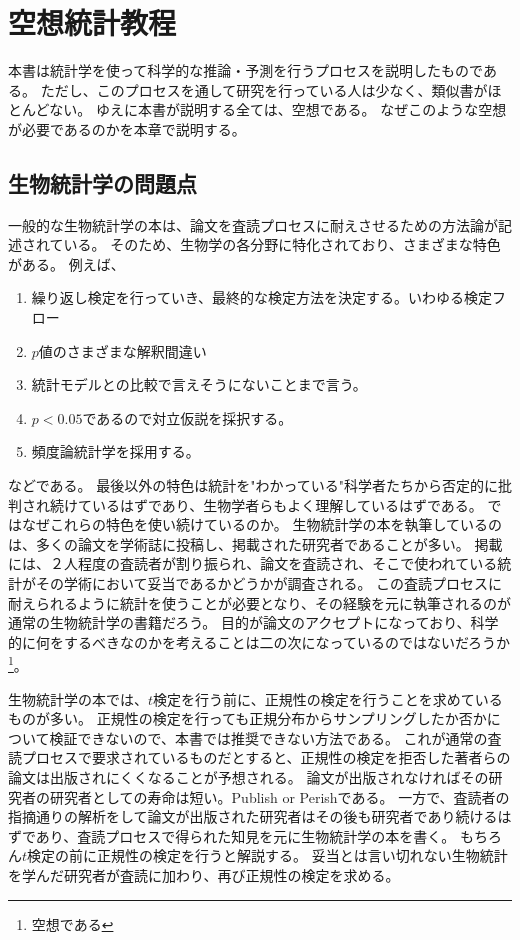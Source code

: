\chapter{空想統計教程}
本書は統計学を使って科学的な推論・予測を行うプロセスを説明したものである。
ただし、このプロセスを通して研究を行っている人は少なく、類似書がほとんどない。
ゆえに本書が説明する全ては、空想である。
なぜこのような空想が必要であるのかを本章で説明する。

\section{生物統計学の問題点}
一般的な生物統計学の本は、論文を査読プロセスに耐えさせるための方法論が記述されている。
そのため、生物学の各分野に特化されており、さまざまな特色がある。
例えば、
\begin{enumerate}
    \item 繰り返し検定を行っていき、最終的な検定方法を決定する。いわゆる検定フロー
    \item $p$値のさまざまな解釈間違い
    \item 統計モデルとの比較で言えそうにないことまで言う。
    \item $p<0.05$であるので対立仮説を採択する。
    \item 頻度論統計学を採用する。
\end{enumerate}
などである。
最後以外の特色は統計を"わかっている"科学者たちから否定的に批判され続けているはずであり、生物学者らもよく理解しているはずである。
ではなぜこれらの特色を使い続けているのか。
生物統計学の本を執筆しているのは、多くの論文を学術誌に投稿し、掲載された研究者であることが多い。
掲載には、２人程度の査読者が割り振られ、論文を査読され、そこで使われている統計がその学術において妥当であるかどうかが調査される。
この査読プロセスに耐えられるように統計を使うことが必要となり、その経験を元に執筆されるのが通常の生物統計学の書籍だろう。
目的が論文のアクセプトになっており、科学的に何をするべきなのかを考えることは二の次になっているのではないだろうか\footnote{空想である}。

生物統計学の本では、$t$検定を行う前に、正規性の検定を行うことを求めているものが多い。
正規性の検定を行っても正規分布からサンプリングしたか否かについて検証できないので、本書では推奨できない方法である。
これが通常の査読プロセスで要求されているものだとすると、正規性の検定を拒否した著者らの論文は出版されにくくなることが予想される。
論文が出版されなければその研究者の研究者としての寿命は短い。Publish or Perishである。
一方で、査読者の指摘通りの解析をして論文が出版された研究者はその後も研究者であり続けるはずであり、査読プロセスで得られた知見を元に生物統計学の本を書く。
もちろん$t$検定の前に正規性の検定を行うと解説する。
妥当とは言い切れない生物統計を学んだ研究者が査読に加わり、再び正規性の検定を求める。


